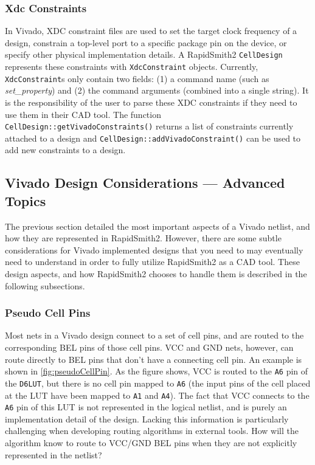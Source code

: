 \subsubsection{Xdc Constraints}
In Vivado, XDC constraint files are used to set the target clock frequency of a
design, constrain a top-level port to a specific package pin on the device, or
specify other physical implementation details. A RapidSmith2 \texttt{CellDesign}
represents these constraints with \texttt{XdcConstraint} objects. Currently,
\texttt{XdcConstraint}s only contain two fields: (1) a command name
(such as \textit{set\_property}) and (2) the command arguments (combined into a
single string). It is the responsibility of the user to parse these XDC
constraints if they need to use them in their CAD tool. The function
\texttt{CellDesign::getVivadoConstraints()} returns a list of constraints
currently attached to a design and \texttt{CellDesign::addVivadoConstraint()}
can be used to add new constraints to a design.

\subsection{Vivado Design Considerations --- Advanced Topics}
The previous section detailed the most important aspects of a Vivado 
netlist, and how they are represented in RapidSmith2. However, there are some
subtle considerations for Vivado implemented designs that you need to
may eventually need to understand in order to fully utilize RapidSmith2 as a CAD
tool.
These design aspects, and how RapidSmith2 chooses to handle them is described in the
following subsections.

\subsubsection{Pseudo Cell Pins} \label{sec:pseudoCellPin}
Most nets in a Vivado design connect to a set of cell pins, and are routed to
the corresponding BEL pins of those cell pins. VCC and GND nets,
however, can route directly to BEL pins that don't have a connecting cell pin.
An example is shown in \autoref{fig:pseudoCellPin}. As the figure shows, VCC is
routed to the \texttt{A6} pin of the \texttt{D6LUT}, but there is no cell pin
mapped to \texttt{A6} (the input pins of the cell placed at the LUT have
been mapped to \texttt{A1} and \texttt{A4}). The fact that VCC connects to the
\texttt{A6} pin of this LUT is not represented in the logical netlist, and is purely an
implementation detail of the design. Lacking this information is particularly
challenging when developing routing algorithms in external tools. How will the
algorithm know to route to VCC/GND BEL pins when they are not explicitly
represented in the netlist?

